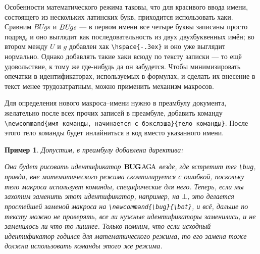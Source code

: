 \documentclass[14pt,russian]{scrartcl}
\newcounter{cExample}
\newtheorem{Example}{Пример}[cExample]
\begin{document}
Особенности математического режима таковы, что для красивого ввода имени, состоящего из нескольких латинских букв, приходится использовать хаки. Сравним $BUgs$ и $BU\hspace{-.3ex}gs$ --- в первом имени все четыре буквы записаны просто подряд, и оно выглядит как последовательность из двух двухбуквенных имён; во втором между $U$ и $g$ добавлен хак \texttt{\textbackslash hspace\{-.3ex\}} и оно уже выглядит нормально. Однако добавлять такие хаки всюду по тексту записки --- то ещё удовольствие, к тому же где-нибудь да он забудется. Чтобы минимизировать опечатки в идентификаторах, используемых в формулах, и сделать их внесение в текст менее трудозатратным, можно применить механизм макросов.

Для определения нового макроса--имени нужно в преамбулу документа, желательно после всех прочих записей в преамбуле, добавить команду \texttt{\textbackslash newcommand\{имя команды, начинается с бэкслэша\}\{тело команды\}}. После этого тело команды будет инлайниться в код вместо указанного имени. 

\begin{Example}
Допустим, в преамбулу добавлена директива:


\vspace{-1.5ex}

\justify Она будет рисовать идентификатор $\mathbf{B\hspace{-0.2ex}U\hspace{-0.2ex}G}\hspace{0.1ex}\mathrm{A\hspace{-0.2ex}G\hspace{-0.2ex}A}$ везде, где встретит тег \texttt{\textbackslash bug}, правда, вне математического режима скомпилируется с ошибкой, поскольку тело макроса использует команды, специфические для него. Теперь, если мы захотим заменить этот идентификатор, например, на $\bot$, это делается простейшей заменой макроса на \texttt{\textbackslash newcommand\{\textbackslash bug\}\{\textbackslash bot\}}, и всё, дальше по тексту можно не проверять, все ли нужные идентификаторы заменились, и не заменилось ли что-то лишнее. Только помним, что если исходный идентификатор годился для математического режима, то его замена тоже должна использовать команды этого же режима.
\end{Example}
\end{document}
